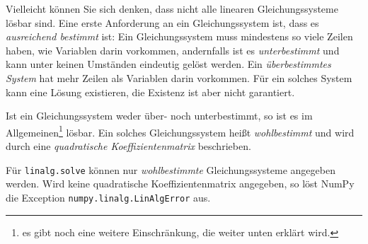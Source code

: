 \begin{hintbox}
Vielleicht können Sie sich denken, dass nicht alle linearen Gleichungssysteme lösbar sind. Eine erste Anforderung an ein Gleichungssystem ist, dass es \emph{ausreichend bestimmt} ist: Ein Gleichungssystem muss mindestens so viele Zeilen haben, wie Variablen darin vorkommen, andernfalls ist es \emph{unterbestimmt} und kann unter keinen Umständen eindeutig gelöst werden. Ein \emph{überbestimmtes System} hat mehr Zeilen als Variablen darin vorkommen. Für ein solches System kann eine Lösung existieren, die Existenz ist aber nicht garantiert.

Ist ein Gleichungssystem weder über- noch unterbestimmt, so ist es im Allgemeinen\footnote{\ie es gibt noch eine weitere Einschränkung, die weiter unten erklärt wird.} lösbar. Ein solches Gleichungssystem heißt \emph{wohlbestimmt} und wird durch eine \emph{quadratische Koeffizientenmatrix} beschrieben.
\end{hintbox}

Für \texttt{linalg.solve} können nur \emph{wohlbestimmte} Gleichungssysteme angegeben werden. Wird keine quadratische Koeffizientenmatrix angegeben, so löst NumPy die Exception \texttt{numpy.linalg.LinAlgError} aus.

